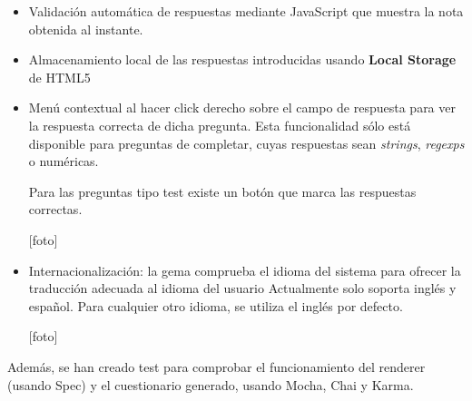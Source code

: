 \begin{itemize}
\begin{itemize}
\begin{itemize}
      [foto]
    \end{itemize}
  \end{itemize}
  
  \item Validaci\'on autom\'atica de respuestas mediante JavaScript que muestra la nota obtenida al instante.
  \item Almacenamiento local de las respuestas introducidas usando {\bfseries Local Storage} de HTML5
  \item Men\'u contextual al hacer click derecho sobre el campo de respuesta para ver la respuesta correcta de dicha pregunta.
  Esta funcionalidad s\'olo est\'a disponible para preguntas de completar, cuyas respuestas sean \textit{strings},
  \textit{regexps} o num\'ericas.
  
  \bigskip
  [foto]
  \bigskip
  
  Para las preguntas tipo test existe un bot\'on que marca las respuestas correctas.
  
  [foto]
  
  \item Internacionalizaci\'on: la gema comprueba el idioma del sistema para ofrecer la traducci\'on adecuada al idioma del usuario
  Actualmente solo soporta ingl\'es y espa\~{n}ol. Para cualquier otro idioma, se utiliza el ingl\'es por defecto.
  
  [foto]

\end{itemize}

Adem\'as, se han creado test para comprobar el funcionamiento del renderer (usando Spec) y el cuestionario generado, usando Mocha, Chai y Karma.


% 
% 